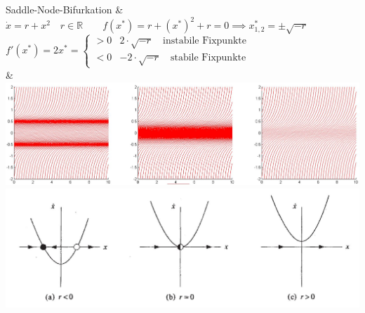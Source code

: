 Saddle-Node-Bifurkation &
$\dot x = r + x^2 \quad r\in\mathbb{R} \qquad f(x^*) = r+(x^*)^2 + r = 0 \implies x^*_{1,2} = \pm \sqrt{-r}$\newline 
$f'(x^*) = 2x^* = \begin{cases}> 0 & 2\cdot\sqrt{-r} \quad \text{instabile Fixpunkte}\\<0 &-2\cdot\sqrt{-r} \quad \text{stabile Fixpunkte}\end{cases}$
\\
&
\includegraphics[scale = .15]{images/bif_saddle_node} 
\includegraphics[scale = .15]{images/bif_saddle_node2} 
\\